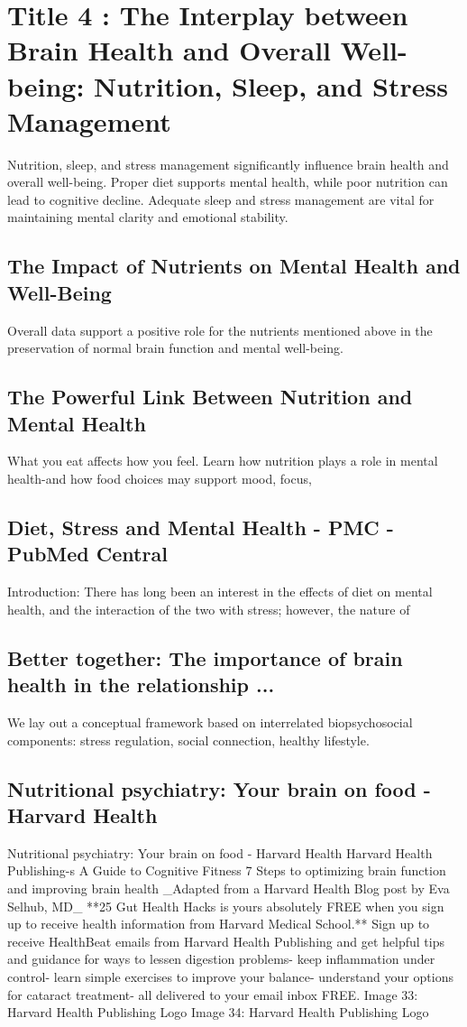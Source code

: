 \documentclass[12pt]{article}
\begin{document}
\section{Title 4 : The Interplay between Brain Health and Overall Well-being: Nutrition, Sleep, and Stress Management}
Nutrition, sleep, and stress management significantly influence brain health and overall well-being. Proper diet supports mental health, while poor nutrition can lead to cognitive decline. Adequate sleep and stress management are vital for maintaining mental clarity and emotional stability.\subsection{The Impact of Nutrients on Mental Health and Well-Being}
Overall data support a positive role for the nutrients mentioned above in the preservation of normal brain function and mental well-being.\subsection{The Powerful Link Between Nutrition and Mental Health}
What you eat affects how you feel. Learn how nutrition plays a role in mental health-and how food choices may support mood, focus,\subsection{Diet, Stress and Mental Health - PMC - PubMed Central}
Introduction: There has long been an interest in the effects of diet on mental health, and the interaction of the two with stress; however, the nature of\subsection{Better together: The importance of brain health in the relationship ...}
We lay out a conceptual framework based on interrelated biopsychosocial components: stress regulation, social connection, healthy lifestyle.\subsection{Nutritional psychiatry: Your brain on food - Harvard Health}
Nutritional psychiatry: Your brain on food - Harvard Health Harvard Health Publishing-s A Guide to Cognitive Fitness 7 Steps to optimizing brain function and improving brain health  \_Adapted from a Harvard Health Blog post by Eva Selhub, MD\_ **25 Gut Health Hacks is yours absolutely FREE when you sign up to receive health information from Harvard Medical School.** Sign up to receive HealthBeat emails from Harvard Health Publishing and get helpful tips and guidance for ways to lessen digestion problems- keep inflammation under control- learn simple exercises to improve your balance- understand your options for cataract treatment- all delivered to your email inbox FREE. Image 33: Harvard Health Publishing Logo Image 34: Harvard Health Publishing Logo
\end{document}
